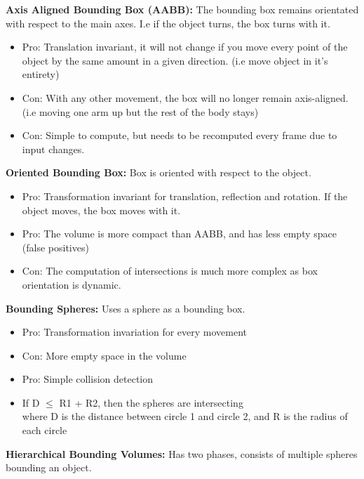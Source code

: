 \documentclass[a4paper,10pt]{article}
\begin{document}
\textcolor{Melon}{\textbf{Axis Aligned Bounding Box (AABB):}} The bounding box remains orientated with respect to the main axes. I.e if the object turns, the box turns with it.
\renewcommand{\labelitemi}{\textperiodcentered}
\begin{itemize}
\item Pro: Translation invariant, it will not change if you move every point of the object by the same amount in a given direction. (i.e move object in it's entirety) 
\item Con: With any other movement, the box will no longer remain axis-aligned. (i.e moving one arm up but the rest of the body stays)
\item Con: Simple to compute, but needs to be recomputed every frame due to input changes. \\
\end{itemize}
\newpage
\noindent \textcolor{Melon}{\textbf{Oriented Bounding Box:}} Box is oriented with respect to the object.
\renewcommand{\labelitemi}{\textperiodcentered}
\begin{itemize}
\item Pro: Transformation invariant for translation, reflection and rotation. If the object moves, the box moves with it. 
\item Pro: The volume is more compact than AABB, and has less empty space (false positives)
\item Con: The computation of intersections is much more complex as box orientation is dynamic. \\
\end{itemize}
\textcolor{Melon}{\textbf{Bounding Spheres:}} Uses a sphere as a bounding box. 
\renewcommand{\labelitemi}{\textperiodcentered}
\begin{itemize}
\item Pro: Transformation invariation for every movement
\item Con: More empty space in the volume 
\item Pro: Simple collision detection
\item If D $\leqslant$ R1 + R2, then the spheres are intersecting  \\ 
where D is the distance between circle 1 and circle 2, and R is the radius of each circle \\
\end{itemize}
\textcolor{Melon}{\textbf{Hierarchical Bounding Volumes:}} Has two phases, consists of multiple spheres bounding an object. 
\renewcommand{\labelitemi}{\textperiodcentered}
\end{document}
